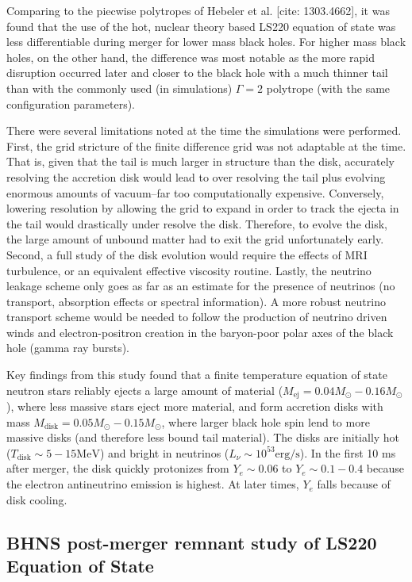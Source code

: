 Comparing to the piecwise polytropes of Hebeler et al. [cite: 1303.4662], it was found that the use of the hot, nuclear theory based LS220 equation of state was less differentiable during merger for lower mass black holes.  
For higher mass black holes, on the other hand, the difference was most notable as the more rapid disruption occurred later and closer to the black hole with a much thinner tail than with the commonly used (in simulations) $\Gamma = 2$ polytrope (with the same configuration parameters).

There were several limitations noted at the time the simulations were performed.
First, the grid stricture of the finite difference grid was not adaptable at the time.  
That is, given that the tail is much larger in structure than the disk, accurately resolving the accretion disk would lead to over resolving the tail plus evolving enormous amounts of vacuum--far too computationally expensive.
Conversely, lowering resolution by allowing the grid to expand in order to track the ejecta in the tail would drastically under resolve the disk.  
Therefore, to evolve the disk, the large amount of unbound matter had to exit the grid unfortunately early.  Second, a full study of the disk evolution would require the effects of MRI turbulence, or an equivalent effective viscosity routine.
Lastly, the neutrino leakage scheme only goes as far as an estimate for the presence of neutrinos (no transport, absorption effects or spectral information).
A more robust neutrino transport scheme would be needed to follow the production of neutrino driven winds and electron-positron creation in the baryon-poor polar axes of the black hole (gamma ray bursts).

Key findings from this study found that a finite temperature equation of state neutron stars reliably ejects a large amount of material ($M_\textrm{ej} = 0.04 M_\odot -  0.16 M_\odot$), where less massive stars eject more material, and form accretion disks with mass $M_\textrm{disk} = 0.05 M_\odot -  0.15 M_\odot$, where larger black hole spin lend to more massive disks (and therefore less bound tail material).  The disks are initially hot ($T_\textrm{disk} \sim 5-15 \textrm{MeV}$) and bright in neutrinos ($L_\nu \sim 10^{53} \textrm{erg/s}$).  In the first 10 ms after merger, the disk quickly protonizes from $Y_e \sim 0.06$ to $Y_e \sim 0.1 - 0.4$ because the electron antineutrino emission is highest.  
At later times, $Y_e$ falls because of disk cooling.

\subsection{BHNS post-merger remnant study of LS220 Equation of State}

